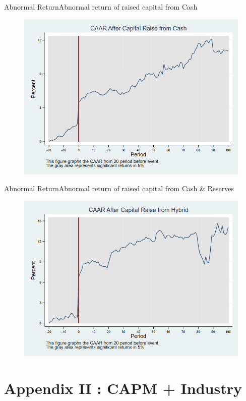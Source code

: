 \documentclass{beamer}
\begin{document}
	
	\begin{frame}{Abnormal Return}{Abnormal return of raised capital from Cash}
		\label{car_withoutalphacash}
		\begin{figure}
			\centering
			\includegraphics[width=0.65\linewidth]{Output/car_withoutalphaCash}
			\label{fig:car_withoutalphacash3}
		\end{figure}
		
	\end{frame}
	
	
	\begin{frame}{Abnormal Return}{Abnormal return of raised capital from Cash \& Reserves}
		\label{car_withoutalphahybrid}
		\begin{figure}
			\centering
			\includegraphics[width=0.65\linewidth]{Output/car_withoutalphaHybrid}
			\label{fig:car_withoutalphahybrid3}
		\end{figure}
		
	\end{frame}
	
	
	
	
	\section{Appendix II : CAPM + Industry}
	
\end{document}
